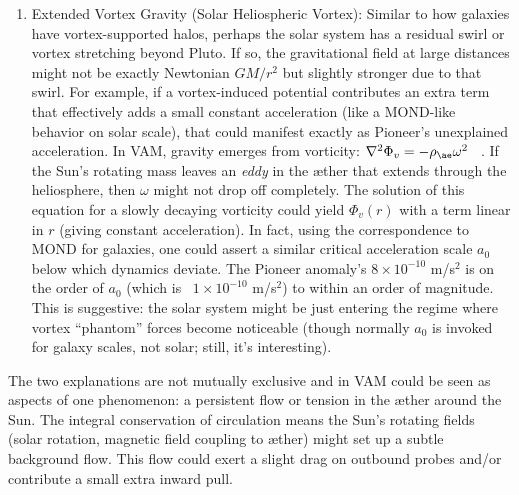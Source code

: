 \documentclass[a4paper, aps,preprint,superscriptaddress, 12pt]{revtex4}
\begin{document}
\begin{enumerate}
\item
Extended Vortex Gravity (Solar Heliospheric Vortex): Similar to how galaxies have vortex-supported halos, perhaps the solar system has a residual swirl or vortex stretching beyond Pluto. If so, the gravitational field at large distances might not be exactly Newtonian $GM/r^2$ but slightly stronger due to that swirl. For example, if a vortex-induced potential contributes an extra term that effectively adds a small constant acceleration (like a MOND-like behavior on solar scale), that could manifest exactly as Pioneer’s unexplained acceleration. In VAM, gravity emerges from vorticity: $\nabla^2 \Phi_v = -\rho_{\ae}\omega^2$~\cite{Iskandarani2025b} . If the Sun’s rotating mass leaves an \textit{eddy} in the æther that extends through the heliosphere, then $\omega$ might not drop off completely. The solution of this equation for a slowly decaying vorticity could yield $\Phi_v(r)$ with a term linear in $r$ (giving constant acceleration). In fact, using the correspondence to MOND for galaxies, one could assert a similar critical acceleration scale $a_0$ below which dynamics deviate. The Pioneer anomaly’s $8\times10^{-10}$ m/s$^2$ is on the order of $a_0$ (which is ~$1\times10^{-10}$ m/s$^2$) to within an order of magnitude. This is suggestive: the solar system might be just entering the regime where vortex “phantom” forces become noticeable (though normally $a_0$ is invoked for galaxy scales, not solar; still, it’s interesting).




\end{enumerate}

The two explanations are not mutually exclusive and in VAM could be seen as aspects of one phenomenon: a persistent flow or tension in the æther around the Sun. The integral conservation of circulation means the Sun’s rotating fields (solar rotation, magnetic field coupling to æther) might set up a subtle background flow. This flow could exert a slight drag on outbound probes and/or contribute a small extra inward pull.
\end{document}
